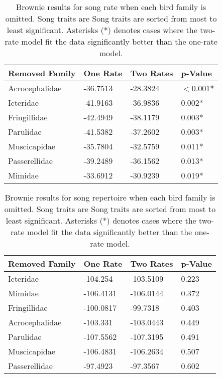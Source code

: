 \documentclass[a4paper,12pt]{article}
\begin{document}
\begin{table}[ht]
\caption{Brownie results for song rate when each bird family is omitted. Song traits are Song traits are sorted from most to least significant. Asterisks (*) denotes cases where the two-rate model fit the data significantly better than the one-rate model.}
\centering
\begin{tabular}{llll}
  \hline
Removed Family & One Rate & Two Rates & p-Value \\ 
  \hline
Acrocephalidae & -36.7513 & -28.3824 & $<$0.001* \\ 
  Icteridae & -41.9163 & -36.9836 & 0.002* \\ 
  Fringillidae & -42.4949 & -38.1179 & 0.003* \\ 
  Parulidae & -41.5382 & -37.2602 & 0.003* \\ 
  Muscicapidae & -35.7804 & -32.5759 & 0.011* \\ 
  Passerellidae & -39.2489 & -36.1562 & 0.013* \\ 
  Mimidae & -33.6912 & -30.9239 & 0.019* \\ 
   \hline
\end{tabular}
\end{table}

\begin{table}[ht]
\caption{Brownie results for song repertoire when each bird family is omitted. Song traits are Song traits are sorted from most to least significant. Asterisks (*) denotes cases where the two-rate model fit the data significantly better than the one-rate model.}
\centering
\begin{tabular}{llll}
  \hline
Removed Family & One Rate & Two Rates & p-Value \\ 
  \hline
Icteridae & -104.254 & -103.5109 & 0.223 \\ 
  Mimidae & -106.4131 & -106.0144 & 0.372 \\ 
  Fringillidae & -100.0817 & -99.7318 & 0.403 \\ 
  Acrocephalidae & -103.331 & -103.0443 & 0.449 \\ 
  Parulidae & -107.5562 & -107.3195 & 0.491 \\ 
  Muscicapidae & -106.4831 & -106.2634 & 0.507 \\ 
  Passerellidae & -97.4923 & -97.3567 & 0.602 \\ 
   \hline
\end{tabular}
\end{table}
\end{document}
